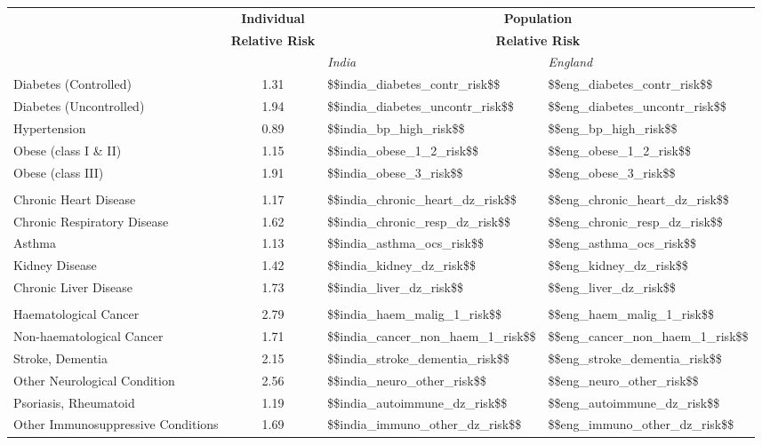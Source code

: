 \begin{tabular}{p{7cm}cp{1.25cm}p{1.5cm}}
& \textbf{{\footnotesize Individual}} &
  \multicolumn{2}{c}{{\textbf{\footnotesize{Population}}}} \\
& \textbf{{\footnotesize Relative Risk}} &
  \multicolumn{2}{c}{{\textbf{\footnotesize{Relative Risk}}}} \\[0.75ex]
  & & \emph{India} & \emph{England} \\[2ex]
Diabetes (Controlled) & \num{1.31} & \num{$$india_diabetes_contr_risk$$} & \num{$$eng_diabetes_contr_risk$$} \\[0.25ex]
Diabetes (Uncontrolled) & \num{1.94} & \num{$$india_diabetes_uncontr_risk$$} & \num{$$eng_diabetes_uncontr_risk$$} \\[0.25ex]
Hypertension & \num{0.89} & \num{$$india_bp_high_risk$$} & \num{$$eng_bp_high_risk$$} \\[0.25ex]
Obese (class I \& II) & \num{1.15} & \num{$$india_obese_1_2_risk$$} & \num{$$eng_obese_1_2_risk$$} \\[0.25ex]
Obese (class III) & \num{1.91} & \num{$$india_obese_3_risk$$} & \num{$$eng_obese_3_risk$$} \\[0.25ex]
\\
Chronic Heart Disease & \num{1.17} & \num{$$india_chronic_heart_dz_risk$$} & \num{$$eng_chronic_heart_dz_risk$$} \\[0.25ex]
Chronic Respiratory Disease & \num{1.62} & \num{$$india_chronic_resp_dz_risk$$} & \num{$$eng_chronic_resp_dz_risk$$} \\[0.25ex]
Asthma & \num{1.13} & \num{$$india_asthma_ocs_risk$$} & \num{$$eng_asthma_ocs_risk$$} \\[0.25ex]
Kidney Disease & \num{1.42} & \num{$$india_kidney_dz_risk$$} & \num{$$eng_kidney_dz_risk$$} \\[0.25ex]
Chronic Liver Disease & \num{1.73} & \num{$$india_liver_dz_risk$$} & \num{$$eng_liver_dz_risk$$} \\[0.25ex]
\\
Haematological Cancer & \num{2.79} & \num{$$india_haem_malig_1_risk$$} & \num{$$eng_haem_malig_1_risk$$} \\[0.25ex]
Non-haematological Cancer & \num{1.71} & \num{$$india_cancer_non_haem_1_risk$$} & \num{$$eng_cancer_non_haem_1_risk$$} \\[0.25ex]
Stroke, Dementia & \num{2.15} & \num{$$india_stroke_dementia_risk$$} & \num{$$eng_stroke_dementia_risk$$} \\[0.25ex]
Other Neurological Condition & \num{2.56} & \num{$$india_neuro_other_risk$$} & \num{$$eng_neuro_other_risk$$} \\[0.25ex]
Psoriasis, Rheumatoid & \num{1.19} & \num{$$india_autoimmune_dz_risk$$} & \num{$$eng_autoimmune_dz_risk$$} \\[0.25ex]
Other Immunosuppressive Conditions & \num{1.69} & \num{$$india_immuno_other_dz_risk$$} & \num{$$eng_immuno_other_dz_risk$$} \\[0.25ex]
\end{tabular}

